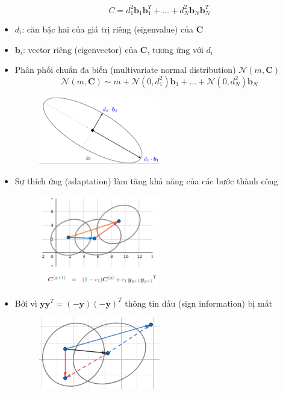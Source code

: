 \documentclass{book}
\begin{document}
\begin{itemize}
        \begin{equation*}
            C=d^2_1\mathbf{b}_1\mathbf{b}_1^{T}+\dots+d_N^2\mathbf{b}_N\mathbf{b}_N^T
        \end{equation*}
        \item[] $d_i$: căn bậc hai của giá trị riêng (eigenvalue) của $\mathbf{C}$
        \item[] $\mathbf{b}_i$: vector riêng (eigenvector) của $\mathbf{C}$, tương ứng với $d_i$
        \item Phân phối chuẩn đa biến (multivariate normal distribution) $\mathcal{N}(m,\mathbf{C})$
        \begin{equation*}
            \mathcal{N}(m,\mathbf{C})\sim m+\mathcal{N}(0,d_1^2)\mathbf{b}_1+\dots+\mathcal{N}(0,d_N^2)\mathbf{b}_N
        \end{equation*}
        \begin{figure}[H]
            \centering
            \includegraphics[width=0.5\textwidth]{images/rank_one_update.png}
        \end{figure}
        \item Sự thích ứng (adaptation) làm tăng khả năng của các bước thành công
        \begin{figure}[H]
            \centering
            \includegraphics[width=0.5\textwidth]{images/rank_one_update_2.png}
        \end{figure}
        \item Bởi vì $\mathbf{y}\mathbf{y}^T=(-\mathbf{y})(-\mathbf{y})^T$ thông tin dấu (sign information) bị mất
        \begin{figure}[H]
            \centering
            \includegraphics[width=0.5\textwidth]{images/rank_one_update_3.png}

\end{figure}
\end{itemize}
\end{document}
